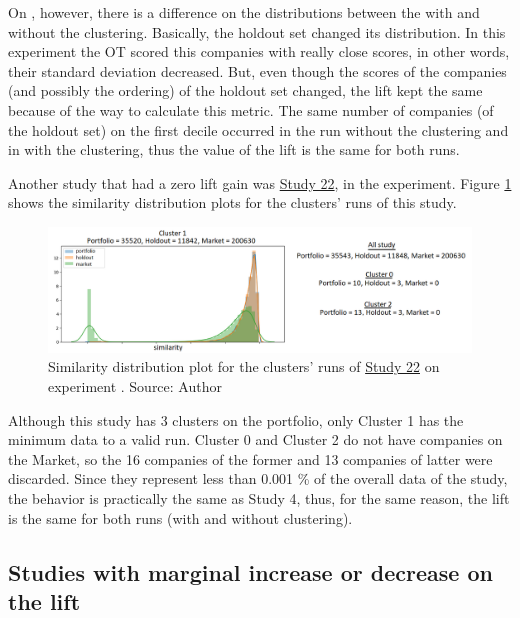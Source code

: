 On \nameExperimentII{}, however, there is a difference on the distributions between the with and without the clustering. Basically, the holdout set changed its distribution. In this experiment the OT scored this companies with really close scores, in other words, their standard deviation decreased. But, even though the scores of the companies (and possibly the ordering) of the holdout set changed, the lift kept the same because of the way to calculate this metric. The same number of companies (of the holdout set) on the first decile occurred in the run without the clustering and in with the clustering, thus the value of the lift is the same for both runs.

Another study that had a zero lift gain was \underline{Study 22}, in the \nameExperimentI{} experiment. Figure \ref{fig:study-22-clusters-simi-plot} shows the similarity distribution plots for the clusters' runs of this study.

\begin{figure}[h]
   \centering
   \includegraphics[width=\linewidth]{fig/ch4-study-22-clusters-simi-plot.png}
   \caption{Similarity distribution plot for the clusters' runs of \underline{Study 22} on experiment \nameExperimentI{}. Source: Author}
   \label{fig:study-22-clusters-simi-plot}
\end{figure}

Although this study has 3 clusters on the portfolio, only Cluster 1 has the minimum data to a valid run. Cluster 0 and Cluster 2 do not have companies on the Market, so the 16 companies of the former and 13 companies of latter were discarded. Since they represent less than 0.001 \% of the overall data of the study, the behavior is practically the same as Study 4, thus, for the same reason, the lift is the same for both runs (with and without clustering).

\subsection{Studies with marginal increase or decrease on the lift}
\label{ch:marginal-change}

